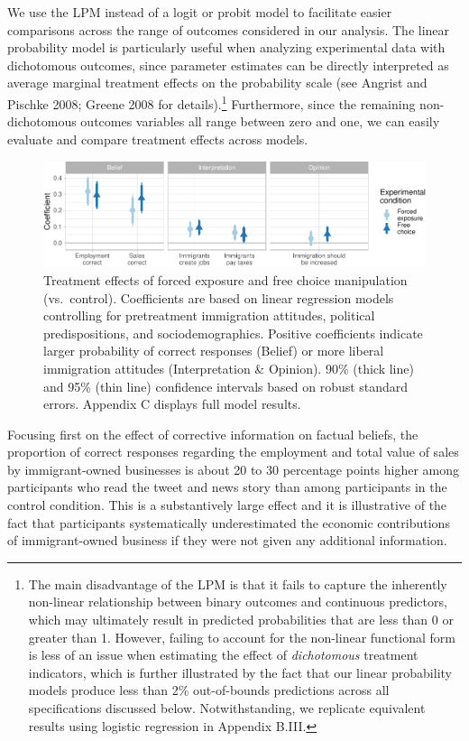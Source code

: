 \documentclass[
  12pt,
]{article}
\begin{document}
We use the LPM instead of a logit or probit model to facilitate easier
comparisons across the range of outcomes considered in our analysis. The
linear probability model is particularly useful when analyzing
experimental data with dichotomous outcomes, since parameter estimates
can be directly interpreted as average marginal treatment effects on the
probability scale (see Angrist and Pischke 2008; Greene 2008 for
details).\footnote{The main disadvantage of the LPM is that it fails to
  capture the inherently non-linear relationship between binary outcomes
  and continuous predictors, which may ultimately result in predicted
  probabilities that are less than 0 or greater than 1. However, failing
  to account for the non-linear functional form is less of an issue when
  estimating the effect of \emph{dichotomous} treatment indicators,
  which is further illustrated by the fact that our linear probability
  models produce less than 2\% out-of-bounds predictions across all
  specifications discussed below. Notwithstanding, we replicate
  equivalent results using logistic regression in Appendix B.III.}
Furthermore, since the remaining non-dichotomous outcomes variables all
range between zero and one, we can easily evaluate and compare treatment
effects across models.

\singlespace

\begin{figure}
\centering
\includegraphics{ReliableSources_files/figure-latex/m1-1.pdf}
\caption{\label{fig:m1}Treatment effects of forced exposure and free
choice manipulation (vs.~control). Coefficients are based on linear
regression models controlling for pretreatment immigration attitudes,
political predispositions, and sociodemographics. Positive coefficients
indicate larger probability of correct responses (Belief) or more
liberal immigration attitudes (Interpretation \& Opinion). 90\% (thick
line) and 95\% (thin line) confidence intervals based on robust standard
errors. Appendix C displays full model results.}
\end{figure}

\doublespace

\noindent Focusing first on the effect of corrective information on
factual beliefs, the proportion of correct responses regarding the
employment and total value of sales by immigrant-owned businesses is
about 20 to 30 percentage points higher among participants who read the
tweet and news story than among participants in the control condition.
This is a substantively large effect and it is illustrative of the fact
that participants systematically underestimated the economic
contributions of immigrant-owned business if they were not given any
additional information.
\end{document}
